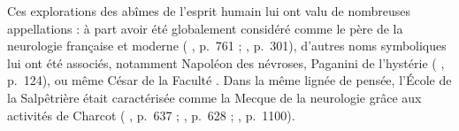 Ces explorations des abîmes de l'esprit humain lui ont valu de nombreuses appellations : à part avoir été globalement considéré comme le père de la neurologie française et moderne (\citeauthor{teive2022thomas} \citeyear{teive2022thomas}, p.~761 ; \citeauthor{broussolle2012} \citeyear{broussolle2012}, p.~301), d'autres noms symboliques lui ont été associés, notamment \og{}Napoléon des névroses\fg{}, \og{}Paganini de l'hystérie\fg{} 
(\citeauthor{mirbeau1995chroniques} \citeyear{mirbeau1995chroniques}, p.~124), ou même \og{}César de la Faculté\fg{} \citep[p.~1109]{camargo2023}. Dans la même lignée de pensée, l'École de la Salpêtrière était caractérisée comme la \og{}Mecque de la neurologie\fg{} grâce aux activités de Charcot (\citeauthor{teive2014126} \citeyear{teive2014126}, p.~637 ; \citeauthor{GOETZ2017628} \citeyear{GOETZ2017628}, p.~628 ; \citeauthor{camargo2023} \citeyear{camargo2023}, p.~1100). 


